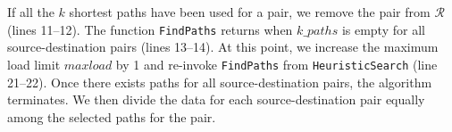 If all the $k$ shortest paths have been used for a pair, we remove the pair from $\mathcal{R}$ (lines 11--12). The function \texttt{FindPaths} returns when $k\_paths$ is empty for all source-destination pairs (lines 13--14). At this point, we increase the maximum load limit $maxload$ by 1 and re-invoke \texttt{FindPaths} from \texttt{HeuristicSearch} (line 21--22). Once there exists paths for all source-destination pairs, the algorithm terminates. We then divide the data for each source-destination pair equally among the selected paths for the pair.

